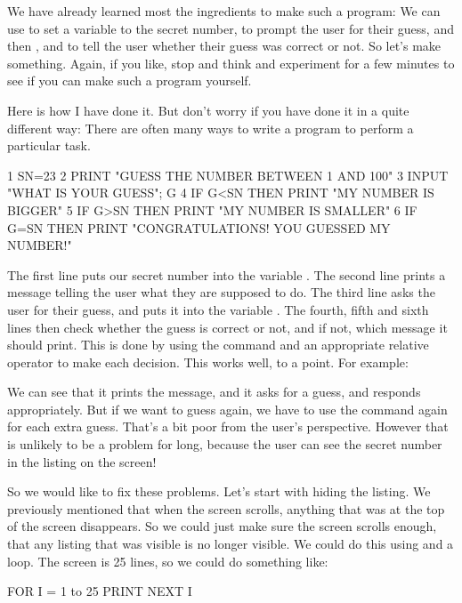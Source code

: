 We have already learned most the ingredients to make such a program: We
can use  to set a variable to the secret number, 
to prompt the user for their guess, and then ,  and
 to tell the user whether their guess was correct or not.
So let's make something. Again, if you like, stop and think and
experiment for a few minutes to see if you can make such a program
yourself.

Here is how I have done it.  But don't worry if you have done it in a
quite different way: There are often many ways to write a program to
perform a particular task.

\begin{screenoutput}
1 SN=23
2 PRINT "GUESS THE NUMBER BETWEEN 1 AND 100"
3 INPUT "WHAT IS YOUR GUESS"; G
4 IF G<SN THEN PRINT "MY NUMBER IS BIGGER"
5 IF G>SN THEN PRINT "MY NUMBER IS SMALLER"
6 IF G=SN THEN PRINT "CONGRATULATIONS! YOU GUESSED MY NUMBER!"
\end{screenoutput}

\needspace{4cm}
The first line puts our secret number into the variable .
The second line prints a message telling the user what they are
supposed to do. The third line asks the user for their guess, and puts
it into the variable . The
fourth, fifth and sixth lines then check whether the guess is correct
or not, and if not, which message it should print. This is done by
using the  command and an appropriate relative operator to
make each decision.  This works well, to a point. For example:


We can see that it prints the message, and it asks for a guess, and
responds appropriately. But if we want to guess again, we have to use
the  command again for each extra guess. That's a bit poor
from the user's perspective. However that is unlikely to be a problem
for long, because the user can see the secret number in the listing on
the screen!

So we would like to fix these problems.  Let's start with hiding the
listing.  We previously mentioned that when the screen scrolls,
anything that was at the top of the screen disappears.  So we could
just make sure the screen scrolls enough, that any listing that was
visible is no longer visible. We could do this using  and a
 loop.  The screen is 25 lines, so we could do something
like:

\begin{screenoutput}
FOR I = 1 to 25
PRINT
NEXT I
\end{screenoutput}

